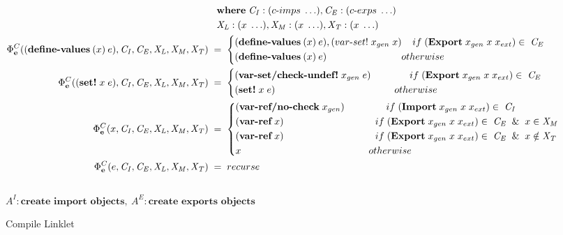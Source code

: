 \documentclass[sigplan,screen,anonymous]{acmart}
\def\dash {\text{-}}
\begin{document}
\begin{figure*}[tbp]
\begin{align*}
    \;          &\;\; \where \mathit{C_I} : (c\dash imps\;\ldots), \mathit{C_E} : (c\dash exps\;\ldots) \\
    \;          &\;\; \mathit{X_L} : (x\;\ldots), \mathit{X_M} : (x\;\ldots), \mathit{X_T} : (x\;\ldots) \\
    \Phi^C_{\textbf{e}}((\textbf{define\dash values}\:(x)\:e),\mathit{C_I}, \mathit{C_E}, \mathit{X_L},\mathit{X_M},\mathit{X_T})\; &=\; \begin{cases*}
      (\textbf{define\dash values}\:(x)\:e), (var\dash set!\; x_{gen}\; x)\;\; \;\; if\; (\textbf{Export}\; x_{gen}\; x\; x_{ext}) \in\;\mathit{C_E} \\
      (\textbf{define\dash values}\:(x)\:e) \hspace{2.5cm} \;\; otherwise
    \end{cases*} \\
    \Phi^C_{\textbf{e}}((\textbf{set!}\; x\; e),\mathit{C_I}, \mathit{C_E}, \mathit{X_L},\mathit{X_M},\mathit{X_T})\; &=\; \begin{cases*}
      (\textbf{var\dash set/check\dash undef!}\; x_{gen}\; e) \hspace{1.4cm} if\; (\textbf{Export}\; x_{gen}\; x\; x_{ext}) \in\;\mathit{C_E}\\
      (\textbf{set!}\; x\; e) \hspace{4.3cm} otherwise
    \end{cases*} \\
    \Phi^C_{\textbf{e}}(x,\mathit{C_I}, \mathit{C_E}, \mathit{X_L},\mathit{X_M},\mathit{X_T})\; &=\; \begin{cases*}
      (\textbf{var\dash ref/no\dash check}\; x_{gen}) \hspace{1.5cm} if\; (\textbf{Import}\; x_{gen}\; x\; x_{ext}) \in\;\mathit{C_I} \\
      (\textbf{var\dash ref}\; x) \hspace{3.3cm} if\; (\textbf{Export}\; x_{gen}\; x\; x_{ext}) \in\;\mathit{C_E}\;\; \&\;\; x\in \mathit{X_M} \\
      (\textbf{var\dash ref}\; x) \hspace{3.3cm} if\; (\textbf{Export}\; x_{gen}\; x\; x_{ext}) \in\;\mathit{C_E}\;\; \&\;\; x\notin \mathit{X_T} \\
      x \hspace{4.6cm} otherwise
    \end{cases*} \\
    \Phi^C_{\textbf{e}}(e,\mathit{C_I}, \mathit{C_E}, \mathit{X_L},\mathit{X_M},\mathit{X_T})\; &=\; recurse \\
  \end{align*} \\
  \hfill \footnotesize $\mathit{A}^I : \textbf{create import objects},\: \mathit{A}^E : \textbf{create exports objects}$
\caption{Compile Linklet}
\label{fig:compile}
\end{figure*}
\end{document}
